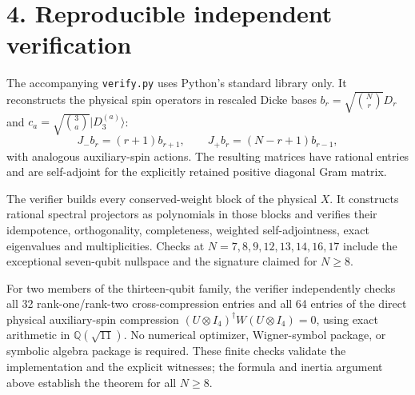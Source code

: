 \documentclass[11pt]{article}
\begin{document}
\section*{4. Reproducible independent verification}
The accompanying \texttt{verify.py} uses Python's standard library only.
It reconstructs the physical spin operators in rescaled Dicke bases
$b_r=\sqrt{\binom Nr}D_r$ and
$c_a=\sqrt{\binom3a}|D_3^{(a)}\rangle$:
\[
 J_-b_r=(r+1)b_{r+1},\qquad J_+b_r=(N-r+1)b_{r-1},
\]
with analogous auxiliary-spin actions. The resulting matrices have
rational entries and are self-adjoint for the explicitly retained
positive diagonal Gram matrix.

The verifier builds every conserved-weight block of the physical $X$.
It constructs rational spectral projectors as polynomials in those
blocks and verifies their idempotence, orthogonality, completeness,
weighted self-adjointness, exact eigenvalues and multiplicities. Checks
at $N=7,8,9,12,13,14,16,17$ include the exceptional seven-qubit nullspace
and the signature claimed for $N\ge8$.

For two members of the thirteen-qubit family, the verifier independently
checks all 32 rank-one/rank-two cross-compression entries and all 64
entries of the direct physical auxiliary-spin compression
$(U\otimes I_4)^\dagger W(U\otimes I_4)=0$, using exact arithmetic in
$\mathbb Q(\sqrt{11})$. No numerical optimizer, Wigner-symbol package,
or symbolic algebra package is required. These finite checks validate
the implementation and the explicit witnesses; the formula and inertia
argument above establish the theorem for all $N\ge8$.
\end{document}
